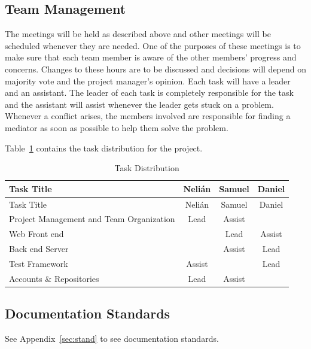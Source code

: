 \subsection{Team Management}

The meetings will be held as described above and other meetings will be
scheduled whenever they are needed. One of the purposes of these meetings is to
make sure that each team member is aware of the other members' progress and
concerns. Changes to these hours are to be discussed and decisions will depend
on majority vote and the project manager's opinion. Each task will have a leader
and an assistant. The leader of each task is completely responsible for the task
and the assistant will assist whenever the leader gets stuck on a problem.
Whenever a conflict arises, the members involved are responsible for finding a
mediator as soon as possible to help them solve the problem.

Table~\ref{tasks} contains the task distribution for the project.

\begin{center}
\setlength{\extrarowheight}{1.5pt}
  \begin{longtable}{|m{3.25in}|c|c|c|}
 \caption{Task Distribution \label{tasks}} \\
   \hline
  
  \centering Task Title & Nelián & Samuel & Daniel \\
  \hline \hline \endfirsthead
  
     \hline

	\centering Task Title & Nelián & Samuel & Daniel \\  
	\hline \hline \endhead
  
  \endfoot  
  
  Project Management and Team Organization & Lead & Assist & \\ \hline
  Web Front end & & Lead & Assist \\ \hline
  Back end Server & & Assist & Lead \\ \hline
  Test Framework & Assist & & Lead \\ \hline
  Accounts \& Repositories & Lead & Assist & \\ \hline
   \end{longtable}
\end{center}

\subsection{Documentation Standards}
See Appendix~\ref{sec:stand} to see documentation standards.